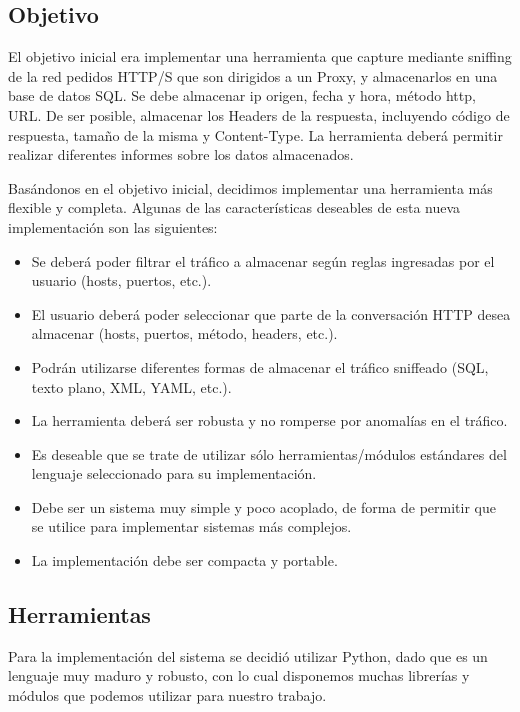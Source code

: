 \subsection*{Objetivo}

El objetivo inicial era implementar una herramienta que capture mediante sniffing de la red pedidos HTTP/S que son dirigidos a un Proxy, y almacenarlos en una base de datos SQL. Se debe almacenar ip origen, fecha y hora, método http, URL. De ser posible, almacenar los Headers de la respuesta, incluyendo código de respuesta, tamaño de la misma y Content-Type. La herramienta deberá permitir realizar diferentes informes sobre los datos almacenados.

Basándonos en el objetivo inicial, decidimos implementar una herramienta más flexible y completa. Algunas de las características deseables de esta nueva implementación son las siguientes:

\begin{itemize}
\item Se deberá poder filtrar el tráfico a almacenar según reglas ingresadas por el usuario (hosts, puertos, etc.).
\item El usuario deberá poder seleccionar que parte de la conversación HTTP desea almacenar (hosts, puertos, método, headers, etc.).
\item Podrán utilizarse diferentes formas de almacenar el tráfico sniffeado (SQL, texto plano, XML, YAML, etc.).
\item La herramienta deberá ser robusta y no romperse por anomalías en el tráfico.
\item Es deseable que se trate de utilizar sólo herramientas/módulos estándares del lenguaje seleccionado para su implementación.
\item Debe ser un sistema muy simple y poco acoplado, de forma de permitir que se utilice para implementar sistemas más complejos.
\item La implementación debe ser compacta y portable.
\end{itemize}

\subsection*{Herramientas}

Para la implementación del sistema se decidió utilizar Python, dado que es un lenguaje muy maduro y robusto, con lo cual disponemos muchas librerías y módulos que podemos utilizar para nuestro trabajo.

